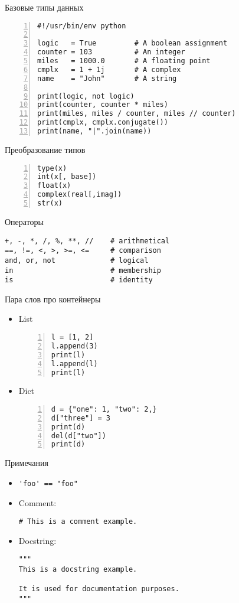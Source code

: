 \documentclass[hyperref={pdftex,unicode}]{beamer}
\begin{document}
\begin{frame}[fragile]{Базовые типы данных}
  \begin{lstlisting}[numbers=left]
#!/usr/bin/env python

logic   = True         # A boolean assignment
counter = 103          # An integer
miles   = 1000.0       # A floating point
cmplx   = 1 + 1j       # A complex
name    = "John"       # A string

print(logic, not logic)
print(counter, counter * miles)
print(miles, miles / counter, miles // counter)
print(cmplx, cmplx.conjugate())
print(name, "|".join(name))
\end{lstlisting}
\end{frame}

\begin{frame}[fragile]{Преобразование типов}
  \begin{lstlisting}[numbers=left]
type(x)
int(x[, base])
float(x)
complex(real[,imag])
str(x)
\end{lstlisting}
\end{frame}

\begin{frame}[fragile]{Операторы}
\begin{lstlisting}
+, -, *, /, %, **, //    # arithmetical
==, !=, <, >, >=, <=     # comparison
and, or, not             # logical
in                       # membership
is                       # identity
\end{lstlisting}
\end{frame}

\begin{frame}[fragile]{Пара слов про контейнеры}
  \begin{itemize}
  \item<1-> List
    \begin{lstlisting}[numbers=left]
l = [1, 2]
l.append(3)
print(l)
l.append(l)
print(l)
    \end{lstlisting}
  \item<2-> Dict
    \begin{lstlisting}[numbers=left]
d = {"one": 1, "two": 2,}
d["three"] = 3
print(d)
del(d["two"])
print(d)
    \end{lstlisting}
  \end{itemize}
\end{frame}

\begin{frame}[fragile]{Примечания}
  \begin{itemize}
    \item \lstinline$'foo' == "foo"$

    \item Comment:
      \begin{lstlisting}
# This is a comment example.
      \end{lstlisting}

    \item Docstring:
      \begin{lstlisting}
"""
This is a docstring example.

It is used for documentation purposes.
"""
      \end{lstlisting}
  \end{itemize}
\end{frame}
\end{document}
